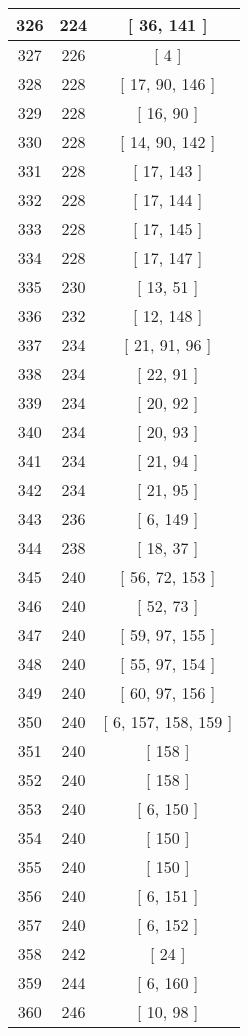 \begin{center}
\begin{longtable}[H]{|| c c c ||}
\hline
326 & 224 & [ 36, 141 ] \\ 
\hline
327 & 226 & [ 4 ] \\ 
\hline
328 & 228 & [ 17, 90, 146 ] \\ 
\hline
329 & 228 & [ 16, 90 ] \\ 
\hline
330 & 228 & [ 14, 90, 142 ] \\ 
\hline
331 & 228 & [ 17, 143 ] \\ 
\hline
332 & 228 & [ 17, 144 ] \\ 
\hline
333 & 228 & [ 17, 145 ] \\ 
\hline
334 & 228 & [ 17, 147 ] \\ 
\hline
335 & 230 & [ 13, 51 ] \\ 
\hline
336 & 232 & [ 12, 148 ] \\ 
\hline
337 & 234 & [ 21, 91, 96 ] \\ 
\hline
338 & 234 & [ 22, 91 ] \\ 
\hline
339 & 234 & [ 20, 92 ] \\ 
\hline
340 & 234 & [ 20, 93 ] \\ 
\hline
341 & 234 & [ 21, 94 ] \\ 
\hline
342 & 234 & [ 21, 95 ] \\ 
\hline
343 & 236 & [ 6, 149 ] \\ 
\hline
344 & 238 & [ 18, 37 ] \\ 
\hline
345 & 240 & [ 56, 72, 153 ] \\ 
\hline
346 & 240 & [ 52, 73 ] \\ 
\hline
347 & 240 & [ 59, 97, 155 ] \\ 
\hline
348 & 240 & [ 55, 97, 154 ] \\ 
\hline
349 & 240 & [ 60, 97, 156 ] \\ 
\hline
350 & 240 & [ 6, 157, 158, 159 ] \\ 
\hline
351 & 240 & [ 158 ] \\ 
\hline
352 & 240 & [ 158 ] \\ 
\hline
353 & 240 & [ 6, 150 ] \\ 
\hline
354 & 240 & [ 150 ] \\ 
\hline
355 & 240 & [ 150 ] \\ 
\hline
356 & 240 & [ 6, 151 ] \\ 
\hline
357 & 240 & [ 6, 152 ] \\ 
\hline
358 & 242 & [ 24 ] \\ 
\hline
359 & 244 & [ 6, 160 ] \\ 
\hline
360 & 246 & [ 10, 98 ] \\ 

\end{longtable}
\end{center}
